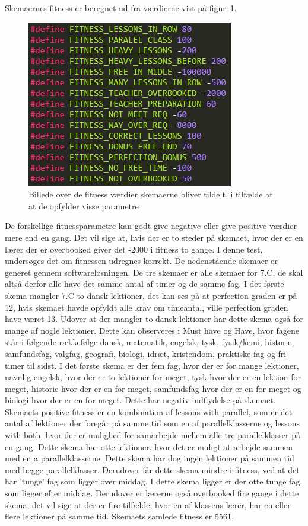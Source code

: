 Skemaernes fitness er beregnet ud fra værdierne vist på figur~\ref{fitnessvalues}.

\begin{figure}[!h]
\includegraphics[scale = 2]{partials/graphics/fitness.png}
\caption{Billede over de fitness værdier skemaerne bliver tildelt, i tilfælde af at de opfylder visse parametre}
\label{fitnessvalues}
\end{figure}
De forskellige fitnessparametre kan godt give negative eller give positive værdier mere end en gang. Det vil sige at, hvis der er to steder på skemaet, hvor der er en lærer der er overbooked giver det -2000 i fitness to gange.
I denne test, undersøges det om fitnessen udregnes korrekt. De nedenstående skemaer er generet gennem softwareløsningen. De tre skemaer er alle skemaer for 7.C, de skal altså derfor alle have det samme antal af timer og de samme fag. 
I det første skema mangler 7.C to dansk lektioner, det kan ses på at perfection graden er  på 12, hvis skemaet havde opfyldt alle krav om timeantal, ville perfection graden have været 13. Udover at der mangler to dansk lektioner har dette skema også for mange af nogle lektioner. Dette kan observeres i Must have og Have, hvor fagene står i følgende rækkefølge dansk, matematik, engelsk, tysk, fysik/kemi, historie, samfundsfag, valgfag, geografi, biologi, idræt, kristendom, praktiske fag og fri timer til sidst. I det første skema er der fem fag, hvor der er for mange lektioner, navnlig engelsk, hvor der er to lektioner for meget, tysk hvor der er en lektion for meget, historie hvor der er en for meget, samfundsfag hvor der er en for meget og biologi hvor der er en for meget. Dette har negativ indflydelse på skemaet.
Skemaets positive fitness er en kombination af lessons with parallel, som er det antal af lektioner der foregår på samme tid som en af parallelklasserne og lessons with both, hvor der er mulighed for samarbejde mellem alle tre parallelklasser på en gang. Dette skema har otte lektioner, hvor det er muligt at arbejde sammen med en a parallelklasserne. Dette skema har dog ingen lektioner på sammen tid med begge parallelklasser. Derudover får dette skema mindre i fitness, ved at det har ’tunge’ fag som ligger over middag. I dette skema ligger er der otte tunge fag, som ligger efter middag. Derudover er lærerne også overbooked fire gange i dette skema, det vil sige at der er fire tilfælde, hvor en af klassens lærer, har en eller flere lektioner på samme tid. Skemaets samlede fitness er 5561. 

